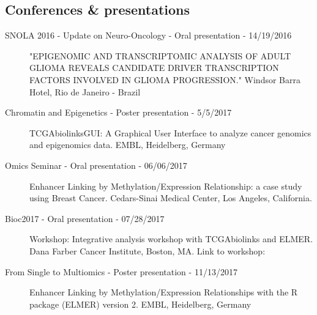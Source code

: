\subsection{Conferences \& presentations}
\begin{description}
	\item[SNOLA 2016 - Update on Neuro-Oncology - Oral presentation - 14/19/2016]{"EPIGENOMIC AND TRANSCRIPTOMIC ANALYSIS OF ADULT GLIOMA
REVEALS CANDIDATE DRIVER TRANSCRIPTION FACTORS
INVOLVED IN GLIOMA PROGRESSION." Windsor Barra Hotel, Rio de Janeiro - Brazil}
    \item[Chromatin and Epigenetics - Poster presentation - 5/5/2017]{TCGAbiolinksGUI: A Graphical User Interface to analyze cancer genomics and epigenomics data. EMBL, Heidelberg, Germany}
	\item[Omics Seminar - Oral presentation - 06/06/2017]{Enhancer Linking by Methylation/Expression Relationship: a case study using Breast Cancer. Cedars-Sinai Medical Center, Los Angeles, California.}
	\item[Bioc2017 - Oral presentation - 07/28/2017]{Workshop: Integrative analysis workshop with TCGAbiolinks and ELMER. Dana Farber Cancer Institute, Boston, MA. Link to workshop: }
\item[From Single to Multiomics - Poster presentation - 11/13/2017]{Enhancer Linking by Methylation/Expression Relationships with the R package (ELMER) version 2. EMBL, Heidelberg, Germany}

\end{description}


%
